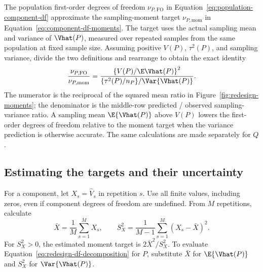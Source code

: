 The population first-order degrees of freedom
\(\nu_{P,\mathrm{FO}}\) in Equation~\eqref{eq:population-component-df}
approximate the sampling-moment target \(\nu_{P,\mathrm{mom}}\) in
Equation~\eqref{eq:component-df-moments}. The target uses the actual
sampling mean and variance of \(\Vhat(P)\), measured over repeated
samples from the same population at fixed sample size. Assuming positive
\(V(P)\), \(\tau^2(P)\), and sampling variance, divide the two
definitions and rearrange to obtain the exact identity
\begin{equation}
 \frac{\nu_{P,\mathrm{FO}}}{\nu_{P,\mathrm{mom}}}
 =\frac{\left\{V(P)/\E\Vhat(P)\right\}^{2}}
        {\{\tau^2(P)/n_P\}/\Var\{\Vhat(P)\}}.
 \label{eq:redesign-df-decomposition}
\end{equation}
The numerator is the reciprocal of the squared mean ratio in
Figure~\ref{fig:redesign-moments}; the denominator is the middle-row
predicted / observed sampling-variance ratio. A sampling mean \(\E\{\Vhat(P)\}\) above \(V(P)\) lowers the first-order
degrees of freedom relative to the moment target when the variance
prediction is otherwise accurate. The same calculations are made
separately for \(Q\).

\subsection{Estimating the targets and their uncertainty}

For a component, let \(X_s=\widehat V_s\) in repetition \(s\). Use
all finite values, including zeros, even if component degrees of freedom
are undefined. From \(M\) repetitions, calculate
\begin{equation}
 \bar X=\frac1M\sum_{s=1}^M X_s,\qquad
 S_X^2=\frac1{M-1}\sum_{s=1}^M(X_s-\bar X)^2.
\end{equation}
For \(S_X^2>0\), the estimated moment target is \(2\bar X^2/S_X^2\).
To evaluate Equation~\eqref{eq:redesign-df-decomposition} for \(P\),
substitute \(\bar X\) for \(\E\{\Vhat(P)\}\) and \(S_X^2\) for
\(\Var\{\Vhat(P)\}\).

